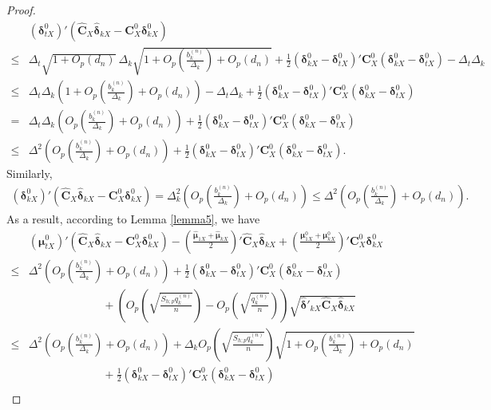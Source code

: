 \documentclass[12pt]{article}
\begin{document}
\begin{proof}{}{}
\begin{align*}
& (\bm \delta_{tX}^0)' (\hat{\bm C}_X \hat{\bm \delta}_{kX} - \bm C_X^0 \bm \delta_{kX}^0) \\
\leq &  \Delta_t \sqrt{1 + O_p(d_n)}~\Delta_k \sqrt{1 + O_p(\frac{b_k^{(n)}}{\Delta_k}) + O_p(d_n)} + \frac{1}{2} (\bm \delta_{kX}^0 - \bm \delta_{tX}^0)' \bm C_X^0 (\bm \delta_{kX}^0 - \bm \delta_{tX}^0) - \Delta_t \Delta_k  \\
\leq & \Delta_t \Delta_k (1 + O_p(\frac{b_k^{(n)}}{\Delta_k}) + O_p(d_n)) - \Delta_t \Delta_k + \frac{1}{2} (\bm \delta_{kX}^0 - \bm \delta_{tX}^0)' \bm C_X^0 (\bm \delta_{kX}^0 - \bm \delta_{tX}^0)  \\
= & \Delta_t \Delta_k (O_p(\frac{b_k^{(n)}}{\Delta_k}) + O_p(d_n)) + \frac{1}{2} (\bm \delta_{kX}^0 - \bm \delta_{tX}^0)' \bm C_X^0 (\bm \delta_{kX}^0 - \bm \delta_{tX}^0)   \\
\leq & \Delta^2 (O_p(\frac{b_k^{(n)}}{\Delta_k}) + O_p(d_n)) + \frac{1}{2} (\bm \delta_{kX}^0 - \bm \delta_{tX}^0)' \bm C_X^0 (\bm \delta_{kX}^0 - \bm \delta_{tX}^0).
\end{align*}
Similarly,
\begin{align*}
(\bm \delta_{kX}^0)' (\hat{\bm C}_X \hat{\bm \delta}_{kX} - \bm C_X^0 \bm \delta_{kX}^0)
= \Delta_k^2 (O_p(\frac{b_k^{(n)}}{\Delta_k}) + O_p(d_n))
\leq \Delta^2 (O_p(\frac{b_k^{(n)}}{\Delta_k}) + O_p(d_n)).
\end{align*}
As a result, according to Lemma \ref{lemma5}, we have
\begin{align*}
& (\bm \mu_{tX}^0)' (\hat{\bm C}_X \hat{\bm \delta}_{kX} - \bm C_X^0 \bm \delta_{kX}^0) - (\frac{\hat{\bm \mu}_{1X} + \hat{\bm \mu}_{kX}}{2})' \hat{\bm C}_X \hat{\bm \delta}_{kX} + (\frac{\bm \mu_{1X}^0 + \bm \mu_{kX}^0}{2})' \bm C_X^0 \bm \delta_{kX}^0   \\
\leq & \Delta^2 (O_p(\frac{b_k^{(n)}}{\Delta_k}) + O_p(d_n)) + \frac{1}{2} (\bm \delta_{kX}^0 - \bm \delta_{tX}^0)' \bm C_X^0 (\bm \delta_{kX}^0 - \bm \delta_{tX}^0) \\
&~~~~~~~~~~~~~~~~~~~~~~~~~~~~~~ + \left( O_p(\sqrt{\frac{S_{h;p} q_k^{(n)}}{n}}) -  O_p(\sqrt{\frac{q_k^{(n)}}{n}}) \right) \sqrt{\hat{\bm \delta}'_{kX} \hat{\bm C}_X \hat{\bm \delta}_{kX}}  \\
\leq & \Delta^2 (O_p(\frac{b_k^{(n)}}{\Delta_k}) + O_p(d_n)) + \Delta_k O_p(\sqrt{\frac{S_{h;p} q_k^{(n)}}{n}}) \sqrt{1 + O_p(\frac{b_k^{(n)}}{\Delta_k}) + O_p(d_n)} \\
&~~~~~~~~~~~~~~~~~~~~~~~~~~~~~~ + \frac{1}{2} (\bm \delta_{kX}^0 - \bm \delta_{tX}^0)' \bm C_X^0 (\bm \delta_{kX}^0 - \bm \delta_{tX}^0)  \\

\end{align*}
\end{proof}
\end{document}
